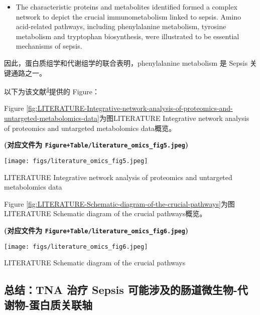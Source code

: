 \documentclass[
]{article}
\providecommand{\tightlist}{%
  \setlength{\itemsep}{0pt}\setlength{\parskip}{0pt}}
\begin{document}
\begin{itemize}
\tightlist
\item
  The characteristic proteins and metabolites identified formed a complex
  network to depict the crucial immunometabolism linked to sepsis. Amino
  acid-related pathways, including phenylalanine metabolism, tyrosine
  metabolism and tryptophan biosynthesis, were illustrated to be essential
  mechanisms of sepsis.
\end{itemize}

因此，蛋白质组学和代谢组学的联合表明，phenylalanine metabolism 是 Sepsis 关键通路之一。

以下为该文献\textsuperscript{\protect\hyperlink{ref-SerumProteomicLiang2021}{4}}提供的 Figure：

Figure \ref{fig:LITERATURE-Integrative-network-analysis-of-proteomics-and-untargeted-metabolomics-data}为图LITERATURE Integrative network analysis of proteomics and untargeted metabolomics data概览。

\textbf{(对应文件为 \texttt{Figure+Table/literature\_omics\_fig5.jpeg})}

\def\@captype{figure}
\begin{center}
\texttt{[image: figs/literature\_omics\_fig5.jpeg]}
\caption{LITERATURE Integrative network analysis of proteomics and untargeted metabolomics data}\label{fig:LITERATURE-Integrative-network-analysis-of-proteomics-and-untargeted-metabolomics-data}
\end{center}

Figure \ref{fig:LITERATURE-Schematic-diagram-of-the-crucial-pathways}为图LITERATURE Schematic diagram of the crucial pathways概览。

\textbf{(对应文件为 \texttt{Figure+Table/literature\_omics\_fig6.jpeg})}

\def\@captype{figure}
\begin{center}
\texttt{[image: figs/literature\_omics\_fig6.jpeg]}
\caption{LITERATURE Schematic diagram of the crucial pathways}\label{fig:LITERATURE-Schematic-diagram-of-the-crucial-pathways}
\end{center}

\hypertarget{ux603bux7ed3tna-ux6cbbux7597-sepsis-ux53efux80fdux6d89ux53caux7684ux80a0ux9053ux5faeux751fux7269-ux4ee3ux8c22ux7269-ux86cbux767dux8d28ux5173ux8054ux8f74}{%
\subsection{总结：TNA 治疗 Sepsis 可能涉及的肠道微生物-代谢物-蛋白质关联轴}\label{ux603bux7ed3tna-ux6cbbux7597-sepsis-ux53efux80fdux6d89ux53caux7684ux80a0ux9053ux5faeux751fux7269-ux4ee3ux8c22ux7269-ux86cbux767dux8d28ux5173ux8054ux8f74}}
\end{document}
